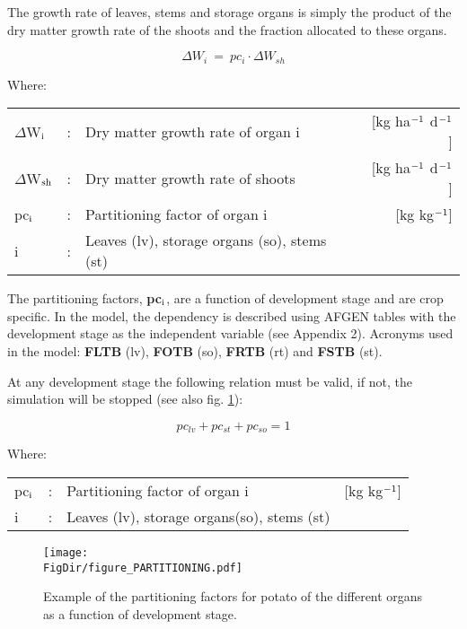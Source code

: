 The growth rate of leaves, stems and storage organs is simply the product of the dry
matter growth rate of the shoots and the fraction allocated to these organs.

\begin{equation}
\label{eq:5.45}
\Delta W_{i} ~=~ pc_{i} \cdot \Delta W_{sh} 
\end{equation}

Where:\\[5pt]
\begin{tabularx}{\textwidth}{llXr}
	$\Delta$W$_{{\rm i}}$ &:& Dry matter growth rate of organ i &
	[kg ha$^{{\rm -1}}$ d$^{{\rm -1}}$]\\
	$\Delta$W$_{{\rm sh}}$ &:& Dry matter growth rate of shoots   &
	[kg ha$^{{\rm -1}}$ d$^{{\rm -1}}$]\\
	pc$_{{\rm i}}$ &:& Partitioning factor of organ i    &
	[kg kg$^{{\rm -1}}$]\\
	i &:& Leaves (lv), storage organs (so), stems (st)
\end{tabularx}

The partitioning factors, {\bf pc$_{{\rm i}}$}, are a function of development stage and are crop specific. In
the model, the dependency is described using AFGEN tables with the development stage
as the independent variable (see Appendix 2). Acronyms used in the model: {\bf FLTB} (lv),
{\bf FOTB} (so), {\bf FRTB} (rt) and {\bf FSTB} (st).

At any development stage the following relation must be valid, if not, the simulation will
be stopped (see also fig. \ref{fig:partitioning}):

\begin{equation}
pc_{lv} + pc_{st} + pc_{so} = 1
\end{equation}

Where:\\[5pt]
\begin{tabularx}{\textwidth}{llXr}
	pc$_{{\rm i}}$ &:& Partitioning factor of organ i   &
	[kg kg$^{{\rm -1}}$]\\
	i &:& Leaves (lv), storage organs(so), stems (st)
\end{tabularx}

\begin{figure}[p]
	\centering
	\texttt{[image: \\FigDir/figure\_PARTITIONING.pdf]}
	\caption{Example of the partitioning factors for potato of the different organs as a function of development stage.}
	\label{fig:partitioning}
\end{figure}

